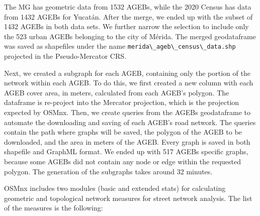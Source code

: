 The MG has geometric data from 1532 AGEBs, while the 2020 Census has data from 1432 AGEBs for Yucatán. After the merge, we ended up with the subset of 1432 AGEBs in both data sets. We further narrow the selection to include only the 523 urban AGEBs belonging to the city of Mérida. The merged geodataframe was saved as shapefiles under the name \verb|merida\_ageb\_census\_data.shp| projected in the Pseudo-Mercator CRS.

Next, we created a subgraph for each AGEB, containing only the portion of the network within each AGEB. To do this, we first created a new column with each AGEB cover area, in meters, calculated from each AGEB's polygon. The dataframe is re-project into the Mercator projection, which is the projection expected by OSMnx. Then, we create queries from the AGEBs geodataframe to automate the downloading and saving of each AGEB's road network. The queries contain the path where graphs will be saved, the polygon of the AGEB to be downloaded, and the area in meters of the AGEB. Every graph is saved in both shapefile and GraphML format. We ended up with 517 AGEBs specific graphs, because some AGEBs did not contain any node or edge within the requested polygon. The generation of the subgraphs takes around 32 minutes.

OSMnx includes two modules (basic and extended stats) for calculating geometric and topological network measures for street network analysis. The list of the measures is the following:

